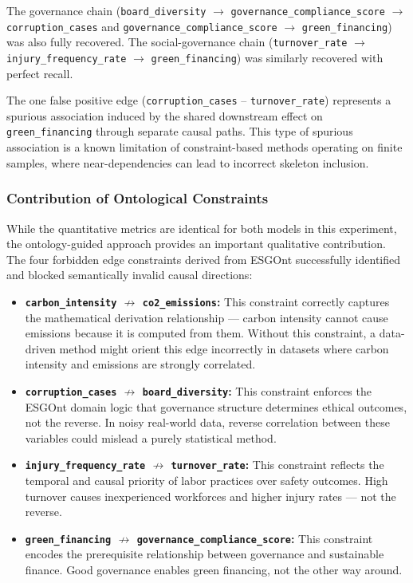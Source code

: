 \documentclass[a4paper,11pt,oneside]{article}
\begin{document}
The governance chain (\texttt{board\_diversity} $\rightarrow$ \texttt{governance\_compliance\_score} $\rightarrow$ \texttt{corruption\_cases} and \texttt{governance\_compliance\_score} $\rightarrow$ \texttt{green\_financing}) was also fully recovered. The social-governance chain (\texttt{turnover\_rate} $\rightarrow$ \texttt{injury\_frequency\_rate} $\rightarrow$ \texttt{green\_financing}) was similarly recovered with perfect recall.

The one false positive edge (\texttt{corruption\_cases} -- \texttt{turnover\_rate}) represents a spurious association induced by the shared downstream effect on \texttt{green\_financing} through separate causal paths. This type of spurious association is a known limitation of constraint-based methods operating on finite samples, where near-dependencies can lead to incorrect skeleton inclusion.

\subsubsection{Contribution of Ontological Constraints}

While the quantitative metrics are identical for both models in this experiment, the ontology-guided approach provides an important qualitative contribution. The four forbidden edge constraints derived from ESGOnt successfully identified and blocked semantically invalid causal directions:

\begin{itemize}
    \item \textbf{\texttt{carbon\_intensity} $\not\rightarrow$ \texttt{co2\_emissions}:} This constraint correctly captures the mathematical derivation relationship — carbon intensity cannot cause emissions because it is computed from them. Without this constraint, a data-driven method might orient this edge incorrectly in datasets where carbon intensity and emissions are strongly correlated.

    \item \textbf{\texttt{corruption\_cases} $\not\rightarrow$ \texttt{board\_diversity}:} This constraint enforces the ESGOnt domain logic that governance structure determines ethical outcomes, not the reverse. In noisy real-world data, reverse correlation between these variables could mislead a purely statistical method.

    \item \textbf{\texttt{injury\_frequency\_rate} $\not\rightarrow$ \texttt{turnover\_rate}:} This constraint reflects the temporal and causal priority of labor practices over safety outcomes. High turnover causes inexperienced workforces and higher injury rates — not the reverse.

    \item \textbf{\texttt{green\_financing} $\not\rightarrow$ \texttt{governance\_compliance\_score}:} This constraint encodes the prerequisite relationship between governance and sustainable finance. Good governance enables green financing, not the other way around.
\end{itemize}
\end{document}
